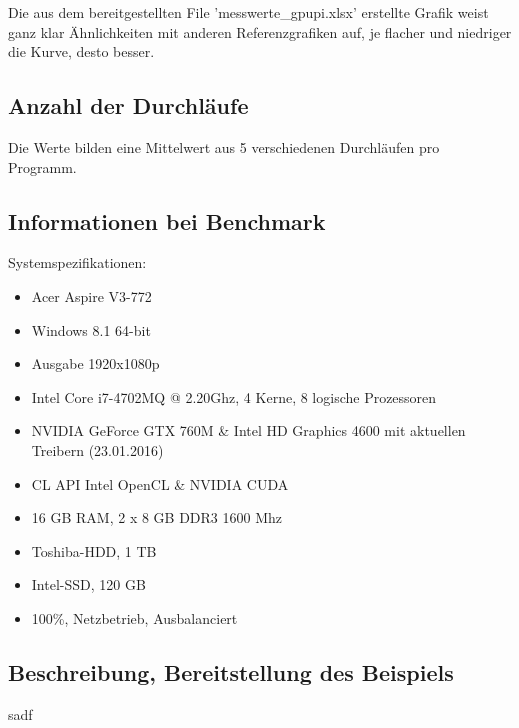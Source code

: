 \documentclass[letterpaper, 12pt]{article}
\let\tempsubsection\subsection
\renewcommand\subsection[1]{\vspace{0cm}\tempsubsection{#1}\vspace{0cm}}
\begin{document}
Die aus dem bereitgestellten File 'messwerte\_gpupi.xlsx' erstellte Grafik weist ganz klar Ähnlichkeiten mit anderen Referenzgrafiken auf, je flacher und niedriger die Kurve, desto besser.
\subsection{Anzahl der Durchläufe}
Die Werte bilden eine Mittelwert aus 5 verschiedenen Durchläufen pro Programm.
\subsection{Informationen bei Benchmark}
Systemspezifikationen:
\begin{itemize}
	\item Acer Aspire V3-772
	\item Windows 8.1 64-bit
	\item Ausgabe 1920x1080p
	\item Intel Core i7-4702MQ @ 2.20Ghz, 4 Kerne, 8 logische Prozessoren
	\item NVIDIA GeForce GTX 760M \& Intel HD Graphics 4600 mit aktuellen Treibern (23.01.2016)
	\item CL API Intel OpenCL \& NVIDIA CUDA
	\item 16 GB RAM, 2 x 8 GB DDR3 1600 Mhz
	\item Toshiba-HDD, 1 TB
	\item Intel-SSD, 120 GB
	\item 100\%, Netzbetrieb, Ausbalanciert
\end{itemize}
\subsection{Beschreibung, Bereitstellung des Beispiels}
sadf

\newpage



\lstlistoflistings
\listoffigures
\end{document}
